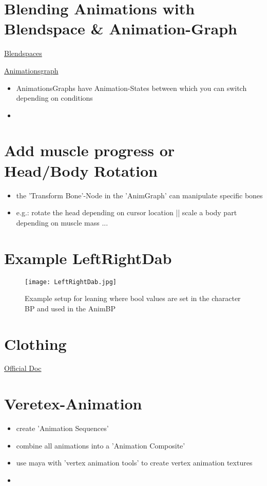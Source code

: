     \section{Blending Animations with Blendspace \& Animation-Graph}
        \uline{Blendspaces}

    \smallskip
        \uline{Animationsgraph}
        \begin{itemize}
            \item AnimationsGraphs have Animation-States between which you can switch depending on conditions
            \item 
        \end{itemize}

    \section{Add muscle progress or Head/Body Rotation}
        \begin{itemize}
            \item the 'Transform Bone'-Node in the 'AnimGraph' can manipulate specific bones
            \item e.g.: rotate the head depending on cursor location || scale a body part depending on muscle mass ...
        \end{itemize}

    \section{Example LeftRightDab}
        \begin{figure}
            \texttt{[image: LeftRightDab.jpg]}
            \caption{Example setup for leaning where bool values are set in the character BP and used in the AnimBP}
        \end{figure}

    \section{Clothing}
        \href{https://docs.unrealengine.com/4.27/en-US/InteractiveExperiences/Physics/Cloth/Overview/}{Official Doc}

    \section{Veretex-Animation}
        \begin{itemize}
            \item create 'Animation Sequences'
            \item combine all animations into a 'Animation Composite'
            \item use maya with 'vertex animation tools' to create vertex animation textures %
            \item 
        \end{itemize}

